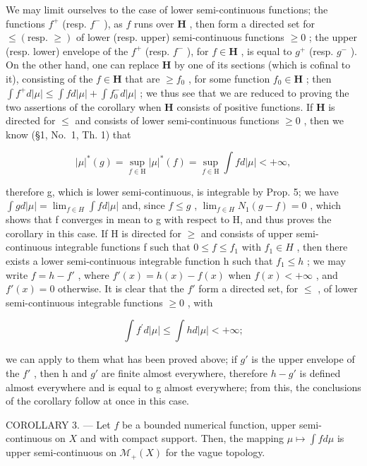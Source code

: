 We may limit ourselves to the case of lower semi-continuous functions; the functions \(f^{+}\) (resp. \(f^{-}\) ), as \(f\) runs over \(\mathbf{H}\) , then form a directed set for \(\leqslant (\text{resp. } \geqslant)\) of lower (resp. upper) semi-continuous functions \(\geqslant 0\) ; the upper (resp. lower) envelope of the \(f^{+}\) (resp. \(f^{-}\) ), for \(f \in \mathbf{H}\) , is equal to \(g^{+}\) (resp. \(g^{-}\) ). On the other hand, one can replace \(\mathbf{H}\) by one of its sections (which is cofinal to it), consisting of the \(f \in \mathbf{H}\) that are \(\geqslant f_{0}\) , for some function \(f_{0} \in \mathbf{H}\) ; then \(\int f^{+} d|\mu| \leqslant \int f d|\mu| + \int f_{0}^{-} d|\mu|\) ; we thus see that we are reduced to proving the two assertions of the corollary when \(\mathbf{H}\) consists of positive functions. If \(\mathbf{H}\) is directed for \(\leqslant\) and consists of lower semi-continuous functions \(\geqslant 0\) , then we know (§1, No.~1, Th. 1) that

\[
| \mu | ^ {*} (g) = \sup _ {f \in \mathrm{H}} | \mu | ^ {*} (f) = \sup _ {f \in \mathrm{H}} \int f d | \mu | <   + \infty ,
\]

therefore g, which is lower semi-continuous, is integrable by Prop. 5; we have \(\int g d|\mu| = \lim_{f \in H} \int f d|\mu|\) and, since \(f \leqslant g\) , \(\lim_{f \in H} N_1(g - f) = 0\) , which shows that f converges in mean to g with respect to H, and thus proves the corollary in this case. If H is directed for \(\geqslant\) and consists of upper semi-continuous integrable functions f such that \(0 \leqslant f \leqslant f_1\) with \(f_1 \in H\) , then there exists a lower semi-continuous integrable function h such that \(f_1 \leqslant h\) ; we may write \(f = h - f'\) , where \(f'(x) = h(x) - f(x)\) when \(f(x) < +\infty\) , and \(f'(x) = 0\) otherwise. It is clear that the \(f'\) form a directed set, for \(\leqslant\) , of lower semi-continuous integrable functions \(\geqslant 0\) , with

\[
\int f ^ {\prime} d | \mu | \leqslant \int h d | \mu | <   + \infty ;
\]

we can apply to them what has been proved above; if \(g'\) is the upper envelope of the \(f'\) , then h and \(g'\) are finite almost everywhere, therefore \(h - g'\) is defined almost everywhere and is equal to g almost everywhere; from this, the conclusions of the corollary follow at once in this case.

COROLLARY 3. --- Let \(f\) be a bounded numerical function, upper semi-continuous on \(X\) and with compact support. Then, the mapping \(\mu \mapsto \int f d\mu\) is upper semi-continuous on \(\mathcal{M}_{+}(X)\) for the vague topology.

